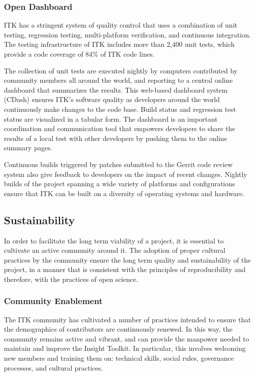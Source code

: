\documentclass{frontiersENG} %
\begin{document}
\subsubsection{Open Dashboard}

ITK has a stringent system of quality control that uses a combination of unit
testing, regression testing, multi-platform verification, and continuous
integration. The testing infrastructure of ITK includes more than 2,400 unit
tests, which provide a code coverage of 84\% of ITK code lines.

The collection of unit tests are executed nightly by computers contributed by
community members all around the world, and reporting to a central online
dashboard that summarizes the results. This web-based dashboard system (CDash)
 \cite{ITKDashboard} ensures ITK$'$s software quality as developers around the
world continuously make changes to the code base. Build status and regression
test status are visualized in a tabular form. The dashboard is an important
coordination and communication tool that empowers developers to share the
results of a local test with other developers by pushing them to the online
summary pages.

Continuous builds triggered by patches submitted to the Gerrit code review
system also give feedback to developers on the impact of recent changes.
Nightly builds of the project spanning a wide variety of platforms and
configurations ensure that ITK can be built on a diversity of operating systems
and hardware.


\subsection{Sustainability}

In order to facilitate the long term viability of a project, it is essential to
cultivate an active community around it. The adoption of proper cultural
practices by the community ensure the long term quality and sustainability of
the project, in a manner that is consistent with the principles of
reproducibility and therefore, with the practices of open science.

\subsubsection{Community Enablement}

The ITK community has cultivated a number of practices intended to ensure that
the demographics of contributors are continuously renewed. In this way, the
community remains active and vibrant, and can provide the manpower needed to
maintain and improve the Insight Toolkit. In particular, this involves welcoming
new members and training them on:  technical skills, social rules, governance
processes, and cultural practices.
\end{document}
